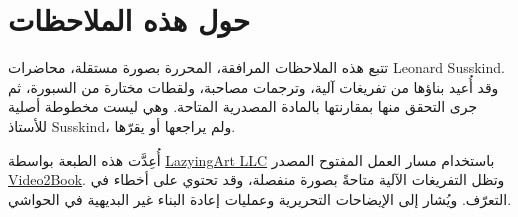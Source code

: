 \documentclass[11pt,oneside]{book}
\begin{document}
\frontmatter
\hypersetup{pageanchor=false}

\hypersetup{pageanchor=true}

\clearpage
\chapter*{حول هذه الملاحظات}
تتبع هذه الملاحظات المرافقة، المحررة بصورة مستقلة، محاضرات Leonard Susskind. وقد أُعيد بناؤها من تفريغات آلية، وترجمات مصاحبة، ولقطات مختارة من السبورة، ثم جرى التحقق منها بمقارنتها بالمادة المصدرية المتاحة. وهي ليست مخطوطة أصلية للأستاذ Susskind، ولم يراجعها أو يقرّها.

أُعِدَّت هذه الطبعة بواسطة \href{https://lazying.art}{LazyingArt LLC} باستخدام مسار العمل المفتوح المصدر \href{https://github.com/lachlanchen/Video2Book}{Video2Book}. وتظل التفريغات الآلية متاحةً بصورة منفصلة، وقد تحتوي على أخطاء في التعرّف. ويُشار إلى الإيضاحات التحريرية وعمليات إعادة البناء غير البديهية في الحواشي.
\clearpage
\tableofcontents
\mainmatter










\end{document}
